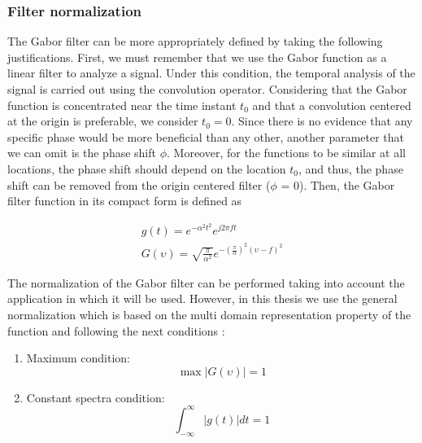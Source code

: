 \subsubsection{Filter normalization} \label{subsec:filter_normalization}
The Gabor filter can be more appropriately defined by taking the following justifications. First, we must remember that we use the Gabor function as a linear filter to analyze a signal. Under this condition, the temporal analysis of the signal is carried out using the convolution operator. Considering that the Gabor function is concentrated near the time instant $t_0$ and that a convolution centered at the origin is preferable, we consider $t_0 = 0$. Since there is no evidence that any specific phase would be more beneficial than any other, another parameter that we can omit is the phase shift $\phi$. Moreover, for the functions to be similar at all locations, the phase shift should depend on the location $t_0$, and thus, the phase shift can be removed from the origin centered filter ($\phi$ = 0). Then, the Gabor filter function in its compact form is defined as 

\begin{equation}\label{eq:gabor_function_1d_timefreq_compact}
    \begin{gathered}
         g(t) =  e ^{-\alpha^2 t^2} e ^{j 2 \pi f t } \\
         G(\upsilon) =  \sqrt{\frac{\pi}{\alpha^2}} e ^{-\left(\frac{\pi}{\alpha}\right) ^{2} (\upsilon-f)^2} 
     \end{gathered}
\end{equation}

The normalization of the Gabor filter can be performed taking into account the application in which it will be used. However, in this thesis we use the general normalization which is based on the multi domain representation property of the function and following the next conditions \citep{Boukerroui.Noble.ea:JMIV:2004}:

\begin{enumerate}
    \item Maximum condition:
        \begin{equation}\label{eq:maximun_condition}
            \max{|G(\upsilon)|} = 1
        \end{equation}
    \item Constant spectra condition:
        \begin{equation}\label{eq:constant_spectrum_condition}
            \int_{-\infty}^{\infty} |g(t)| dt = 1
        \end{equation}        
\end{enumerate}

